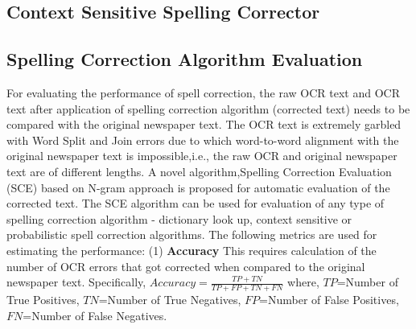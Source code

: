 \documentclass[preprint,11pt]{elsarticle}
\begin{document}
\subsection{Context Sensitive Spelling Corrector}



\subsection{Spelling Correction Algorithm Evaluation }
\label{spell:sce}
For evaluating the performance of spell correction, the raw OCR text and OCR text after application of spelling correction algorithm (corrected text) needs to be compared with the original newspaper text. The OCR text is extremely garbled with Word Split and Join errors due to which word-to-word alignment with the original newspaper text is impossible,i.e., the raw OCR and original newspaper text are of different lengths. A novel algorithm,Spelling Correction Evaluation (SCE) based on N-gram approach is proposed for automatic evaluation of the corrected text. %
The SCE algorithm can be used for evaluation of any type of spelling correction algorithm - dictionary look up, context sensitive or probabilistic spell correction algorithms.
The  following metrics are used for estimating the performance:
(1) \textbf{Accuracy }This requires calculation of the number of OCR errors that got corrected when compared to the original newspaper text. Specifically,
$Accuracy=  \frac{TP+TN} {TP+ FP + TN + FN}$ where, $TP$=Number of True Positives, $TN$=Number of True Negatives, $FP$=Number of False Positives, $FN$=Number of False Negatives. %
\end{document}
